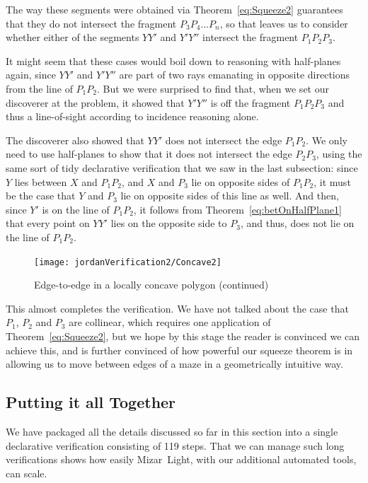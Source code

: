 The way these segments were obtained via Theorem~\ref{eq:Squeeze2} guarantees that they do not intersect the fragment $P_3P_4\ldots P_n$, so that leaves us to consider whether either of the segments $YY'$ and $Y'Y''$ intersect the fragment $P_1P_2P_3$. 

It might seem that these cases would boil down to reasoning with half-planes again, since $YY'$ and $Y'Y''$ are part of two rays emanating in opposite directions from the line of $P_1P_2$. But we were surprised to find that, when we set our discoverer at the problem, it showed that $Y'Y''$ is off the fragment $P_1P_2P_3$ and thus a line-of-sight according to incidence reasoning alone.

The discoverer also showed that $YY'$ does not intersect the edge $P_1P_2$. We only need to use half-planes to show that it does not intersect the edge $P_2P_3$, using the same sort of tidy declarative verification that we saw in the last subsection: since $Y$ lies between $X$ and $P_1P_2$, and $X$ and $P_3$ lie on opposite sides of $P_1P_2$, it must be the case that $Y$ and $P_3$ lie on opposite sides of this line as well. And then, since $Y'$ is on the line of $P_1P_2$, it follows from Theorem~\ref{eq:betOnHalfPlane1} that every point on $YY'$ lies on the opposite side to $P_3$, and thus, does not lie on the line of $P_1P_2$. 

\begin{figure}
\centering\texttt{[image: jordanVerification2/Concave2]}
\caption{Edge-to-edge in a locally concave polygon (continued)}
\label{fig:Concave2}
\end{figure}

This almost completes the verification. We have not talked about the case that $P_1$, $P_2$ and $P_3$ are collinear, which requires one application of Theorem~\ref{eq:Squeeze2}, but we hope by this stage the reader is convinced we can achieve this, and is further convinced of how powerful our squeeze theorem is in allowing us to move between edges of a maze in a geometrically intuitive way.

\subsection{Putting it all Together}
We have packaged all the details discussed so far in this section into a single declarative verification consisting of 119 steps. That we can manage such long verifications shows how easily Mizar~Light, with our additional automated tools, can scale.

